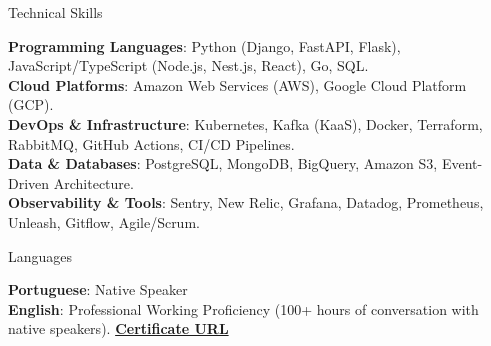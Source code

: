 \documentclass{resume} %
\begin{document}






\begin{rSection}{Technical Skills}
    \small{\item{
     \textbf{Programming Languages}{: Python (Django, FastAPI, Flask), JavaScript/TypeScript (Node.js, Nest.js, React), Go, SQL.} \\
     \textbf{Cloud Platforms}{: Amazon Web Services (AWS), Google Cloud Platform (GCP).} \\
     \textbf{DevOps \& Infrastructure}{: Kubernetes, Kafka (KaaS), Docker, Terraform, RabbitMQ, GitHub Actions, CI/CD Pipelines.} \\
     \textbf{Data \& Databases}{: PostgreSQL, MongoDB, BigQuery, Amazon S3, Event-Driven Architecture.} \\
     \textbf{Observability \& Tools}{: Sentry, New Relic, Grafana, Datadog, Prometheus, Unleash, Gitflow, Agile/Scrum.}
    }}
\end{rSection}

\begin{rSection}{Languages}
    \small{\item{
     \textbf{Portuguese}: Native Speaker \\
     \textbf{English}: Professional Working Proficiency (100+ hours of conversation with native speakers). \href{https://www.cambly.com/en/certificate/verify/778478f1}{\textbf{Certificate URL}}
    }}
\end{rSection}
\end{document}
